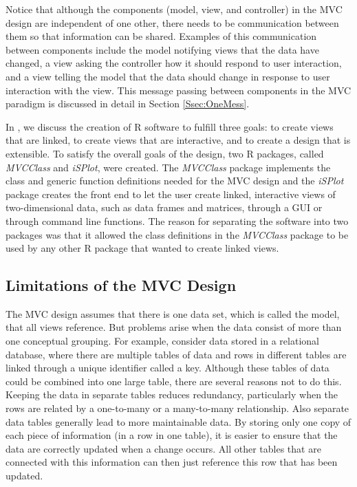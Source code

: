 \documentclass{article}[11pt]
\newcommand{\Rpackage}[1]{{\textit{#1}}}
\begin{document}
Notice that although the components (model, view, and controller) in the MVC
design are independent of one other, there needs to be communication
between them so that information can be shared.  Examples of this
communication between components include the model notifying views that the
data have changed, a view asking the controller how it should respond to user
interaction, and a view telling the model that the data should change in
response to user interaction with the view.  This message passing between
components in the MVC paradigm is discussed in detail in Section
\ref{Ssec:OneMess}.   

In \cite{EW05}, we discuss the creation of R software to fulfill three goals:
to create views that are linked, to create views that are interactive, and to
create a design that is extensible.  To satisfy the overall goals of the
design, two R packages, called \Rpackage{MVCClass} and \Rpackage{iSPlot},
were created.  The \Rpackage{MVCClass} package implements the class and
generic function definitions needed for the MVC design and the
\Rpackage{iSPlot} package creates the front end to let the user create linked,
interactive views of two-dimensional data, such as data frames and matrices,
through a GUI or through command line functions.  The reason for
separating the software into two packages was that it allowed the class
definitions in the \Rpackage{MVCClass} package to be used by any other R
package that wanted to create linked views. 

\subsection{Limitations of the MVC Design}\label{Ssec:Limit}

The MVC design assumes that there is one data set, which is called the model,
that all views reference.  But problems arise when the data consist of more
than one conceptual grouping.  For example, consider data stored in a
relational database, where there are multiple tables of data and rows in
different tables are linked through a unique identifier called a key.
Although these tables of data could be combined into one large table, there
are several reasons not to do this.  Keeping the data in separate tables
reduces redundancy, particularly when the rows are related by a one-to-many or
a many-to-many relationship.  Also separate data tables generally lead to more
maintainable data.  By storing only one copy of each piece of information (in
a row in one table), it is easier to ensure that the data are correctly
updated when a change occurs.  All other tables that are connected with this
information can then just reference this row that has been updated. 
\end{document}
